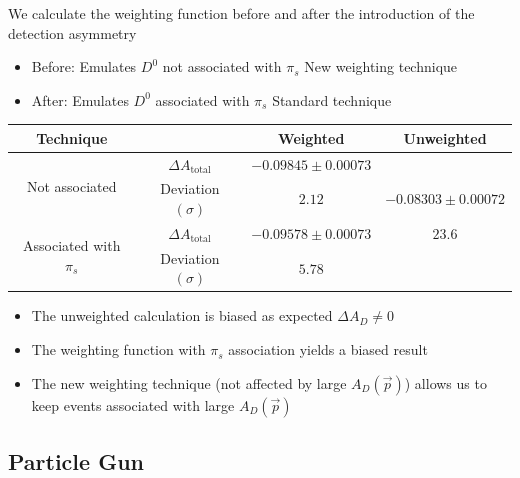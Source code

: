 \documentclass{beamer}
\begin{document}
\begin{frame}
      \frametitle{\insertsubsectionhead}
      \rightarrow We calculate the weighting function before and after the introduction of the detection asymmetry
      \begin{itemize}
            \item Before: Emulates $D^0$ not associated with $\pi_s$ \Rightarrow New weighting technique
            \item After: Emulates $D^0$ associated with $\pi_s$ \Rightarrow Standard technique
      \end{itemize}
      \begin{center}
            \scriptsize
            \begin{tabular}{c|c|c|c}
                  Technique& & Weighted & Unweighted\\
                  \hline\hline
                  \multirow{2}{*}{Not associated} & $\Delta A_\text{total}$ & $-0.09845 \pm 0.00073$ & \\
                  & Deviation $(\sigma)$ & $2.12$ & $-0.08303 \pm 0.00072$\\
                  \cline{1-3}
                  \multirow{2}{*}{Associated with $\pi_s$} & $\Delta A_\text{total}$ & $-0.09578 \pm 0.00073$ & $23.6$\\
                  & Deviation $(\sigma)$ & $5.78$ & \\
          \end{tabular}
    \end{center}
    \normalsize
    \begin{itemize}
      \item The unweighted calculation is biased as expected \rightarrow $\Delta A_D \neq 0$
      \item The weighting function with $\pi_s$ association yields a biased result
      \item The new weighting technique (not affected by large $A_D(\vec{p})$) allows us to keep events associated with large $A_D(\vec{p})$ 
    \end{itemize}
\end{frame}

\subsection{Particle Gun}
\end{document}
